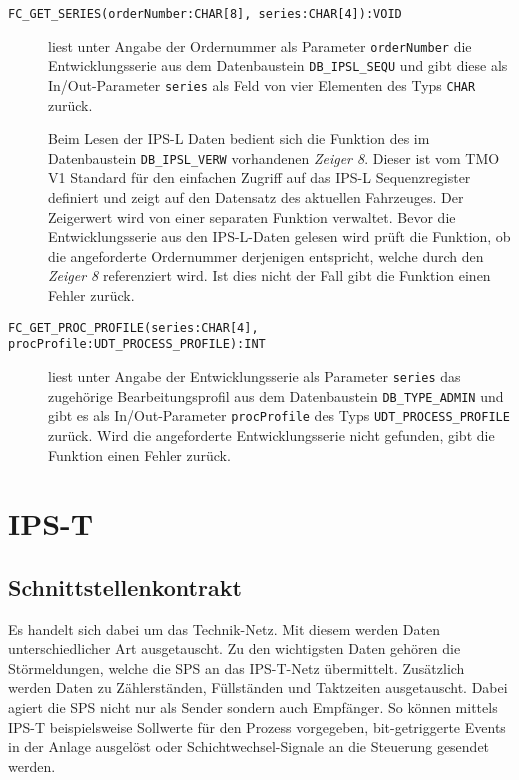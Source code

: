 \begin{description}
    \item [\texttt{FC\_GET\_SERIES(orderNumber:CHAR[8], series:CHAR[4]):VOID}] liest unter Angabe der Ordernummer als Parameter \texttt{orderNumber} die Entwicklungsserie aus dem Datenbaustein \texttt{DB\_IPSL\_SEQU} und gibt diese als In/Out-Parameter \texttt{series} als Feld von vier Elementen des Typs \texttt{CHAR} zurück.\par    
    Beim Lesen der IPS-L Daten bedient sich die Funktion des im Datenbaustein \texttt{DB\_IPSL\_VERW} vorhandenen \emph{Zeiger 8}. Dieser ist vom TMO V1 Standard für den einfachen Zugriff auf das IPS-L Sequenzregister definiert und zeigt auf den Datensatz des aktuellen Fahrzeuges. Der Zeigerwert wird von einer separaten Funktion verwaltet. Bevor die Entwicklungsserie aus den IPS-L-Daten gelesen wird prüft die Funktion, ob die angeforderte Ordernummer derjenigen entspricht, welche durch den \emph{Zeiger 8} referenziert wird. Ist dies nicht der Fall gibt die Funktion einen Fehler zurück.\leer
    
    \item [\texttt{FC\_GET\_PROC\_PROFILE(series:CHAR[4], procProfile:UDT\_PROCESS\_PROFILE):INT}] liest unter Angabe der Entwicklungsserie als Parameter \texttt{series} das zugehörige Bearbeitungsprofil aus dem Datenbaustein \texttt{DB\_TYPE\_ADMIN} und gibt es als In/Out-Parameter \texttt{procProfile} des Typs \texttt{UDT\_PROCESS\_PROFILE} zurück. Wird die angeforderte Entwicklungsserie nicht gefunden, gibt die Funktion einen Fehler zurück.
    
\end{description}


\section{IPS-T}
\label{sec:ips_t}

\subsection{Schnittstellenkontrakt}
\label{subsec:ips_t_contract}

 Es handelt sich dabei um das Technik-Netz. Mit diesem werden Daten unterschiedlicher Art ausgetauscht. Zu den wichtigsten Daten gehören die Störmeldungen, welche die SPS an das IPS-T-Netz übermittelt. Zusätzlich werden Daten zu Zählerständen, Füllständen und Taktzeiten ausgetauscht. Dabei agiert die SPS nicht nur als Sender sondern auch Empfänger. So können mittels IPS-T beispielsweise Sollwerte für den Prozess  vorgegeben, bit-getriggerte Events in der Anlage ausgelöst oder Schichtwechsel-Signale an die Steuerung gesendet werden. 


